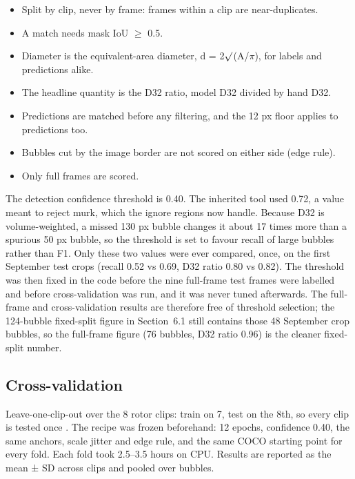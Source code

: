\begin{itemize}
\tightlist
\item
  Split by clip, never by frame: frames within a clip are
  near-duplicates.
\item
  A match needs mask IoU $\geq$ 0.5.
\item
  Diameter is the equivalent-area diameter, d = 2$\surd$(A/$\pi$), for labels and
  predictions alike.
\item
  The headline quantity is the D32 ratio, model D32 divided by hand D32.
\item
  Predictions are matched before any filtering, and the 12 px floor
  applies to predictions too.
\item
  Bubbles cut by the image border are not scored on either side (edge
  rule).
\item
  Only full frames are scored.
\end{itemize}

The detection confidence threshold is 0.40. The inherited tool used
0.72, a value meant to reject murk, which the ignore regions now handle.
Because D32 is volume-weighted, a missed 130 px bubble changes it about
17 times more than a spurious 50 px bubble, so the threshold is set to
favour recall of large bubbles rather than F1. Only these two values
were ever compared, once, on the first September test crops (recall
0.52 vs 0.69, D32 ratio 0.80 vs 0.82). The threshold was then fixed in
the code before the nine full-frame test frames were labelled and before
cross-validation was run, and it was never tuned afterwards. The
full-frame and cross-validation results are therefore free of threshold
selection; the 124-bubble fixed-split figure in Section~6.1 still
contains those 48 September crop bubbles, so the full-frame figure (76
bubbles, D32 ratio 0.96) is the cleaner fixed-split number.

\hypertarget{cross-validation}{%
\subsection{Cross-validation}\label{cross-validation}}

Leave-one-clip-out over the 8 rotor clips: train on 7, test on the 8th,
so every clip is tested once \citep{roberts2017}. The recipe was frozen
beforehand: 12 epochs, confidence 0.40, the same anchors, scale jitter
and edge rule, and the same COCO starting point for every fold. Each
fold took 2.5--3.5 hours on CPU. Results are reported as the mean ± SD
across clips and pooled over bubbles.

